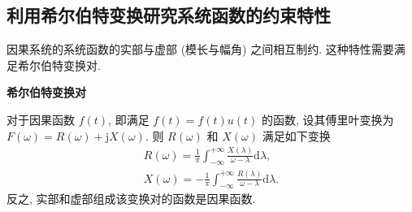 \subsection{利用希尔伯特变换研究系统函数的约束特性} \label{5 利用希尔伯特变换研究系统函数的约束特性}
因果系统的系统函数的实部与虚部 (模长与幅角) 之间相互制约. 这种特性需要满足希尔伯特变换对.

\textbf{希尔伯特变换对}

对于因果函数 $f(t)$, 即满足 $f(t)=f(t)u(t)$ 的函数, 设其傅里叶变换为 $F(\omega)=R(\omega)+\mathrm{j}X(\omega)$. 则 $R(\omega)$ 和 $X(\omega)$ 满足如下变换
\begin{gather}
    R(\omega)=\frac{1}{\pi}\int_{-\infty}^{+\infty}\frac{X(\lambda)}{\omega-\lambda}\mathrm{d}\lambda, \\
    X(\omega)=-\frac{1}{\pi}\int_{-\infty}^{+\infty}\frac{R(\lambda)}{\omega-\lambda}\mathrm{d}\lambda.
\end{gather}
反之, 实部和虚部组成该变换对的函数是因果函数.
